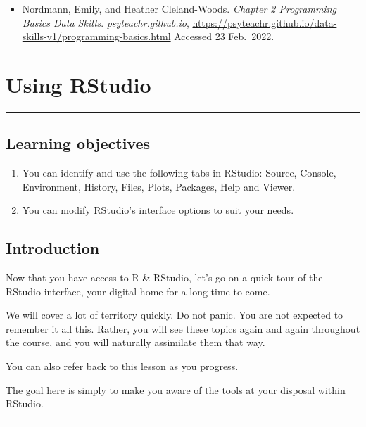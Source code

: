 \documentclass[
  letterpaper,
  DIV=11,
  numbers=noendperiod]{scrreprt}
\providecommand{\tightlist}{%
  \setlength{\itemsep}{0pt}\setlength{\parskip}{0pt}}\usepackage{longtable,booktabs,array}
\begin{document}
\begin{itemize}
\tightlist
\item
  Nordmann, Emily, and Heather Cleland-Woods. \emph{Chapter 2
  Programming Basics \textbar{} Data Skills}.
  \emph{psyteachr.github.io},
  \url{https://psyteachr.github.io/data-skills-v1/programming-basics.html}
  Accessed 23 Feb.~2022.
\end{itemize}

\chapter{Using RStudio}\label{using-rstudio}

\begin{center}\rule{0.5\linewidth}{0.5pt}\end{center}

\section{Learning objectives}\label{learning-objectives}

\begin{enumerate}
\def\labelenumi{\arabic{enumi}.}
\item
  You can identify and use the following tabs in RStudio: Source,
  Console, Environment, History, Files, Plots, Packages, Help and
  Viewer.
\item
  You can modify RStudio's interface options to suit your needs.
\end{enumerate}

\section{Introduction}\label{introduction-2}

Now that you have access to R \& RStudio, let's go on a quick tour of
the RStudio interface, your digital home for a long time to come.

We will cover a lot of territory quickly. Do not panic. You are not
expected to remember it all this. Rather, you will see these topics
again and again throughout the course, and you will naturally assimilate
them that way.

You can also refer back to this lesson as you progress.

The goal here is simply to make you aware of the tools at your disposal
within RStudio.

\begin{center}\rule{0.5\linewidth}{0.5pt}\end{center}
\end{document}

